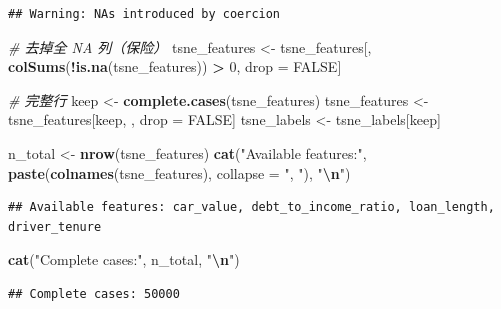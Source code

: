 \documentclass[
]{article}
\newenvironment{Shaded}{\begin{snugshade}}{\end{snugshade}}
\newcommand{\AttributeTok}[1]{\textcolor[rgb]{0.13,0.29,0.53}{#1}}
\newcommand{\CommentTok}[1]{\textcolor[rgb]{0.56,0.35,0.01}{\textit{#1}}}
\newcommand{\ConstantTok}[1]{\textcolor[rgb]{0.56,0.35,0.01}{#1}}
\newcommand{\DecValTok}[1]{\textcolor[rgb]{0.00,0.00,0.81}{#1}}
\newcommand{\FunctionTok}[1]{\textcolor[rgb]{0.13,0.29,0.53}{\textbf{#1}}}
\newcommand{\NormalTok}[1]{#1}
\newcommand{\OtherTok}[1]{\textcolor[rgb]{0.56,0.35,0.01}{#1}}
\newcommand{\SpecialCharTok}[1]{\textcolor[rgb]{0.81,0.36,0.00}{\textbf{#1}}}
\newcommand{\StringTok}[1]{\textcolor[rgb]{0.31,0.60,0.02}{#1}}
\begin{document}
\begin{verbatim}
## Warning: NAs introduced by coercion
\end{verbatim}

\begin{Shaded}
\begin{Highlighting}[]
\CommentTok{\# 去掉全 NA 列（保险）}
\NormalTok{tsne\_features }\OtherTok{\textless{}{-}}\NormalTok{ tsne\_features[, }\FunctionTok{colSums}\NormalTok{(}\SpecialCharTok{!}\FunctionTok{is.na}\NormalTok{(tsne\_features)) }\SpecialCharTok{\textgreater{}} \DecValTok{0}\NormalTok{, drop }\OtherTok{=} \ConstantTok{FALSE}\NormalTok{]}

\CommentTok{\# 完整行}
\NormalTok{keep }\OtherTok{\textless{}{-}} \FunctionTok{complete.cases}\NormalTok{(tsne\_features)}
\NormalTok{tsne\_features }\OtherTok{\textless{}{-}}\NormalTok{ tsne\_features[keep, , drop }\OtherTok{=} \ConstantTok{FALSE}\NormalTok{]}
\NormalTok{tsne\_labels }\OtherTok{\textless{}{-}}\NormalTok{ tsne\_labels[keep]}

\NormalTok{n\_total }\OtherTok{\textless{}{-}} \FunctionTok{nrow}\NormalTok{(tsne\_features)}
\FunctionTok{cat}\NormalTok{(}\StringTok{"Available features:"}\NormalTok{, }\FunctionTok{paste}\NormalTok{(}\FunctionTok{colnames}\NormalTok{(tsne\_features), }\AttributeTok{collapse =} \StringTok{", "}\NormalTok{), }\StringTok{"}\SpecialCharTok{\textbackslash{}n}\StringTok{"}\NormalTok{)}
\end{Highlighting}
\end{Shaded}

\begin{verbatim}
## Available features: car_value, debt_to_income_ratio, loan_length, driver_tenure
\end{verbatim}

\begin{Shaded}
\begin{Highlighting}[]
\FunctionTok{cat}\NormalTok{(}\StringTok{"Complete cases:"}\NormalTok{, n\_total, }\StringTok{"}\SpecialCharTok{\textbackslash{}n}\StringTok{"}\NormalTok{)}
\end{Highlighting}
\end{Shaded}

\begin{verbatim}
## Complete cases: 50000
\end{verbatim}
\end{document}
